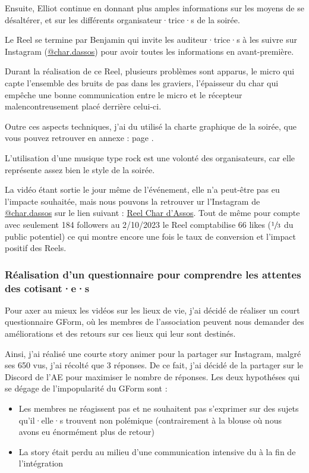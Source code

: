 Ensuite, Elliot continue en donnant plus amples informations sur les moyens de se désaltérer, et sur les différents organisateur·trice·s de la soirée.

Le Reel se termine par Benjamin qui invite les auditeur·trice·s à les suivre sur Instagram (\href{https://www.instagram.com/char.dassos/}{@char.dassos}) pour avoir toutes les informations en avant-première.

Durant la réalisation de ce Reel, plusieurs problèmes sont apparus, le micro qui capte l'ensemble des bruits de pas dans les graviers, l'épaisseur du char qui empêche une bonne communication entre le micro et le récepteur malencontreusement placé derrière celui-ci.

Outre ces aspects techniques, j'ai du utilisé la charte graphique de la soirée, que vous pouvez retrouver en annexe : page \pageref{subsec:charte-char-dassos}.

L'utilisation d'une musique type rock est une volonté des organisateurs, car elle représente assez bien le style de la soirée.

La vidéo étant sortie le jour même de l'événement, elle n'a peut-être pas eu l'impacte souhaitée, mais nous pouvons la retrouver ur l'Instagram de \href{https://www.instagram.com/char.dassos/}{@char.dassos} sur le lien suivant : \href{https://www.instagram.com/reel/Cxuj5g2MKov/?utm_source=ig_web_button_share_sheet&igshid=MzRlODBiNWFlZA==}{Reel Char d'Assos}.
Tout de même pour compte avec seulement 184 followers au 2/10/2023 le Reel comptabilise 66 likes ($\sfrac{1}{3}$ du public potentiel) ce qui montre encore une fois le taux de conversion et l'impact positif des Reels.

\subsubsection{Réalisation d'un questionnaire pour comprendre les attentes des cotisant·e·s}

Pour axer au mieux les vidéos sur les lieux de vie, j'ai décidé de réaliser un court questionnaire GForm, où les membres de l'association peuvent nous demander des améliorations et des retours sur ces lieux qui leur sont destinés.

Ainsi, j'ai réalisé une courte story animer pour la partager sur Instagram, malgré ses 650 vus, j'ai récolté que 3 réponses.
De ce fait, j'ai décidé de la partager sur le Discord de l'\gls{AE} pour maximiser le nombre de réponses.
Les deux hypothéses qui se dégage de l'impopularité du GForm sont :
\begin{itemize}
    \item Les membres ne réagissent pas et ne souhaitent pas s'exprimer sur des sujets qu'il·elle·s trouvent non polémique (contrairement à la blouse où nous avons eu énormément plus de retour)
    \item La story était perdu au milieu d'une communication intensive du à la fin de l'intégration
\end{itemize}

